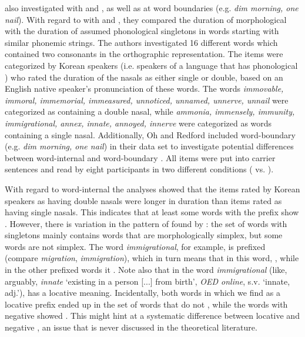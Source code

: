 \cite{Oh.2012} also investigated  with  and , as well as  at word boundaries  (e.g. \textit{dim morning, one nail}). With regard to  with  and , they compared the duration of morphological  with the duration of assumed phonological singletons in words starting with similar phonemic strings. The authors investigated 16 different words which contained two consonants in the orthographic representation.  The items were categorized  by Korean speakers (i.e. speakers of a language that has phonological ) who rated the duration of the nasals as either single or double, based on an English native speaker’s pronunciation of these words. The words \textit{immovable, immoral, immemorial, immeasured, unnoticed, unnamed, unnerve, unnail} were categorized as containing a double nasal, while \textit{ammonia, immensely, immunity, immigrational, annex, innate, annoyed, innerve} were categorized as words containing a single nasal. 
Additionally, Oh and Redford included word-boundary  (e.g. \textit{dim morning, one nail}) in their data set to investigate potential differences between word-internal and word-boundary . All items were put into carrier sentences and read by eight participants in two different conditions ( vs. ). 

With regard to word-internal  the analyses showed that the items rated by Korean speakers as having double nasals were longer in duration than items rated as having single nasals. This indicates that at least some words with the prefix  show .
However, there is variation in the  pattern of  found by \cite{Oh.2012}: the set of words with singletons mainly contains words that are morphologically simplex, but some words are not simplex. The word \textit{immigrational}, for example, is prefixed (compare \textit{migration}, \textit{immigration}), which in turn means that in this word,  , while in the other prefixed words it . Note also that  in the word \textit{immigrational} (like, arguably, \textit{innate} `existing in a person [...] from birth', \textit{OED online}\nocite{OED.2013}, s.v. `innate, adj.'), has a locative meaning. Incidentally, both words in which we find  as a locative prefix ended up in the set of words that do not , while the words with negative  showed . This might hint at a systematic difference between locative and negative , an issue that is never discussed in the theoretical literature.

